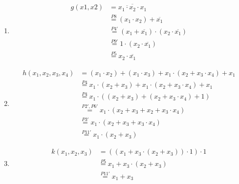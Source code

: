 \documentclass[a4paper]{article}
\begin{document}
\begin{enumerate}[label=\alph*)]
    \item
        \begin{equation}
        \begin{aligned}
            g(x1, x2) &= \overline{\overline{x_1 \cdot x_2} \cdot x_1} \\
            &\stackrel{P8}{=} (x_1 \cdot x_2) + \overline{x_1} \\
            &\stackrel{P4'}{=} (x_1 + \overline{x_1}) \cdot (x_2 \cdot \overline{x_1}) \\
            &\stackrel{P9'}{=} 1 \cdot (x_2 \cdot \overline{x_1}) \\
            &\stackrel{P5}{=} x_2 \cdot \overline{x_1}
        \end{aligned}
        \end{equation}

    \item
        \begin{equation}
        \begin{aligned}
            h(x_1, x_2, x_3, x_4) &= (x_1 \cdot x_2) + (x_1 \cdot x_3) + x_1 \cdot (x_2 + x_3 \cdot x_4) + x_1 \\
            &\stackrel{P4}{=} x_1 \cdot (x_2 + x_3) + x_1 \cdot (x_2 + x_3 \cdot x_4) + x_1 \\
            &\stackrel{P4}{=} x_1 \cdot ((x_2 + x_3) + (x_2 + x_3 \cdot x_4) + 1) \\
            &\stackrel{P2', P6'}{=} x_1 \cdot ( x_2 + x_3 + x_2 + x_3 \cdot x_4) \\
            &\stackrel{P3'}{=} x_1 \cdot ( x_2 + x_3 + x_3 \cdot x_4) \\
            &\stackrel{P11'}{=} x_1 \cdot ( x_2 + x_3)
        \end{aligned}
        \end{equation}

    \item
        \begin{equation}
        \begin{aligned}
            k(x_1, x_2, x_3) &= ((x_1 + x_3 \cdot (x_2 + x_3)) \cdot 1) \cdot 1 \\
            &\stackrel{P5}{=} x_1 + x_3 \cdot (x_2 + x_3) \\
            &\stackrel{P11'}{=} x_1 + x_3
        \end{aligned}
        \end{equation}
\end{enumerate}
\end{document}
